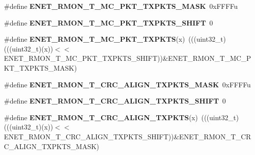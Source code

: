 \begin{DoxyCompactItemize}
\item 
\#define {\bfseries E\+N\+E\+T\+\_\+\+R\+M\+O\+N\+\_\+\+T\+\_\+\+M\+C\+\_\+\+P\+K\+T\+\_\+\+T\+X\+P\+K\+T\+S\+\_\+\+M\+A\+SK}~0x\+F\+F\+F\+Fu\hypertarget{group__ENET__Register__Masks_gaf3856023c28aa2585937b9b2e3e46fcd}{}\label{group__ENET__Register__Masks_gaf3856023c28aa2585937b9b2e3e46fcd}

\item 
\#define {\bfseries E\+N\+E\+T\+\_\+\+R\+M\+O\+N\+\_\+\+T\+\_\+\+M\+C\+\_\+\+P\+K\+T\+\_\+\+T\+X\+P\+K\+T\+S\+\_\+\+S\+H\+I\+FT}~0\hypertarget{group__ENET__Register__Masks_ga5b480910d2725a8c75b23a0327898400}{}\label{group__ENET__Register__Masks_ga5b480910d2725a8c75b23a0327898400}

\item 
\#define {\bfseries E\+N\+E\+T\+\_\+\+R\+M\+O\+N\+\_\+\+T\+\_\+\+M\+C\+\_\+\+P\+K\+T\+\_\+\+T\+X\+P\+K\+TS}(x)~(((uint32\+\_\+t)(((uint32\+\_\+t)(x))$<$$<$E\+N\+E\+T\+\_\+\+R\+M\+O\+N\+\_\+\+T\+\_\+\+M\+C\+\_\+\+P\+K\+T\+\_\+\+T\+X\+P\+K\+T\+S\+\_\+\+S\+H\+I\+FT))\&E\+N\+E\+T\+\_\+\+R\+M\+O\+N\+\_\+\+T\+\_\+\+M\+C\+\_\+\+P\+K\+T\+\_\+\+T\+X\+P\+K\+T\+S\+\_\+\+M\+A\+SK)\hypertarget{group__ENET__Register__Masks_gacb7fa6647506149367368bd1abcdc94e}{}\label{group__ENET__Register__Masks_gacb7fa6647506149367368bd1abcdc94e}

\item 
\#define {\bfseries E\+N\+E\+T\+\_\+\+R\+M\+O\+N\+\_\+\+T\+\_\+\+C\+R\+C\+\_\+\+A\+L\+I\+G\+N\+\_\+\+T\+X\+P\+K\+T\+S\+\_\+\+M\+A\+SK}~0x\+F\+F\+F\+Fu\hypertarget{group__ENET__Register__Masks_gacccd1e251e3c6aa0159af65a0aee2772}{}\label{group__ENET__Register__Masks_gacccd1e251e3c6aa0159af65a0aee2772}

\item 
\#define {\bfseries E\+N\+E\+T\+\_\+\+R\+M\+O\+N\+\_\+\+T\+\_\+\+C\+R\+C\+\_\+\+A\+L\+I\+G\+N\+\_\+\+T\+X\+P\+K\+T\+S\+\_\+\+S\+H\+I\+FT}~0\hypertarget{group__ENET__Register__Masks_ga2736c6ffc11baa5ce09a120c967841e1}{}\label{group__ENET__Register__Masks_ga2736c6ffc11baa5ce09a120c967841e1}

\item 
\#define {\bfseries E\+N\+E\+T\+\_\+\+R\+M\+O\+N\+\_\+\+T\+\_\+\+C\+R\+C\+\_\+\+A\+L\+I\+G\+N\+\_\+\+T\+X\+P\+K\+TS}(x)~(((uint32\+\_\+t)(((uint32\+\_\+t)(x))$<$$<$E\+N\+E\+T\+\_\+\+R\+M\+O\+N\+\_\+\+T\+\_\+\+C\+R\+C\+\_\+\+A\+L\+I\+G\+N\+\_\+\+T\+X\+P\+K\+T\+S\+\_\+\+S\+H\+I\+FT))\&E\+N\+E\+T\+\_\+\+R\+M\+O\+N\+\_\+\+T\+\_\+\+C\+R\+C\+\_\+\+A\+L\+I\+G\+N\+\_\+\+T\+X\+P\+K\+T\+S\+\_\+\+M\+A\+SK)\hypertarget{group__ENET__Register__Masks_ga46c296756912f29ddce9f6c181f6790d}{}\label{group__ENET__Register__Masks_ga46c296756912f29ddce9f6c181f6790d}


\end{DoxyCompactItemize}
